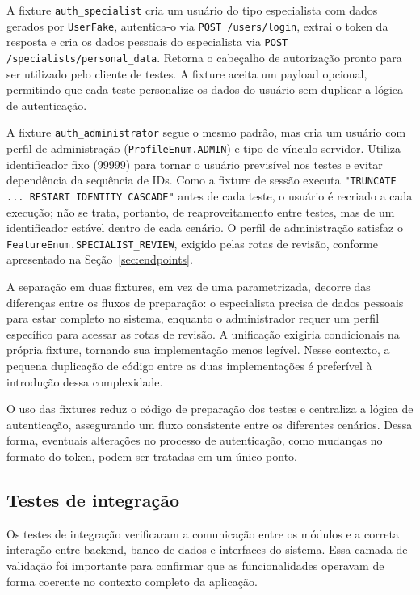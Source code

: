 A fixture \texttt{auth\_specialist} cria um usuário do tipo especialista
com dados gerados por \texttt{UserFake}, autentica-o via \texttt{POST /users/login},
extrai o token da resposta e cria os dados pessoais do especialista via
\texttt{POST /specialists/personal\_data}. Retorna o cabeçalho de autorização
pronto para ser utilizado pelo cliente de testes. A fixture aceita um payload
opcional, permitindo que cada teste personalize os dados do usuário sem duplicar
a lógica de autenticação.

A fixture \texttt{auth\_administrator} segue o mesmo padrão, mas cria um
usuário com perfil de administração (\texttt{ProfileEnum.ADMIN}) e tipo
de vínculo servidor. Utiliza identificador fixo (99999) para tornar o
usuário previsível nos testes e evitar dependência da sequência de IDs.
Como a fixture de sessão executa \texttt{"TRUNCATE ... RESTART IDENTITY CASCADE"} 
antes de cada teste, o usuário é recriado a cada execução; não se
trata, portanto, de reaproveitamento entre testes, mas de um identificador
estável dentro de cada cenário. O perfil de administração satisfaz o
\texttt{FeatureEnum.SPECIALIST\_REVIEW}, exigido pelas rotas de revisão,
conforme apresentado na Seção~\ref{sec:endpoints}.

A separação em duas fixtures, em vez de uma parametrizada, decorre das diferenças entre
os fluxos de preparação: o especialista precisa de dados pessoais para estar completo no
sistema, enquanto o administrador requer um perfil específico para acessar as rotas de
revisão. A unificação exigiria condicionais na própria fixture, tornando sua
implementação menos legível. Nesse contexto, a pequena duplicação de código entre as
duas implementações é preferível à introdução dessa complexidade.

O uso das fixtures reduz o código de preparação dos testes e centraliza a lógica de
autenticação, assegurando um fluxo consistente entre os diferentes cenários. Dessa
forma, eventuais alterações no processo de autenticação, como mudanças no formato do
token, podem ser tratadas em um único ponto.

\subsection{Testes de integração}
\label{sec:testes-integracao}
Os testes de integração verificaram a comunicação entre os módulos e a correta interação
entre backend, banco de dados e interfaces do sistema. Essa camada de validação foi
importante para confirmar que as funcionalidades operavam de forma coerente no contexto
completo da aplicação.

